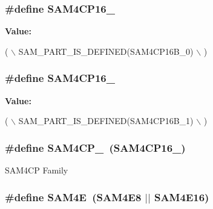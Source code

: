 \hypertarget{group__sam__part__macros__group_gaa7359e4b343a4ab48894b656b2f349b9}{
\subsubsection[{S\-A\-M4\-C\-P16\-\_\-0}]{\setlength{\rightskip}{0pt plus 5cm}\#define S\-A\-M4\-C\-P16\-\_}}\label{group__sam__part__macros__group_gaa7359e4b343a4ab48894b656b2f349b9}
{\bfseries Value\-:}
\begin{DoxyCode}
( \(\backslash\)
                SAM\_PART\_IS\_DEFINED(SAM4CP16B\_0) \(\backslash\)
                )
\end{DoxyCode}
\hypertarget{group__sam__part__macros__group_ga6757116bcbffd58eca2b98b620175590}{
\subsubsection[{S\-A\-M4\-C\-P16\-\_\-1}]{\setlength{\rightskip}{0pt plus 5cm}\#define S\-A\-M4\-C\-P16\-\_}}\label{group__sam__part__macros__group_ga6757116bcbffd58eca2b98b620175590}
{\bfseries Value\-:}
\begin{DoxyCode}
( \(\backslash\)
                SAM\_PART\_IS\_DEFINED(SAM4CP16B\_1) \(\backslash\)
                )
\end{DoxyCode}
\hypertarget{group__sam__part__macros__group_ga01ca8a083b5d4d9ba3c24c9314f69264}{
\subsubsection[{S\-A\-M4\-C\-P\-\_\-0}]{\setlength{\rightskip}{0pt plus 5cm}\#define S\-A\-M4\-C\-P\-\_~(S\-A\-M4\-C\-P16\-\_)}}\label{group__sam__part__macros__group_ga01ca8a083b5d4d9ba3c24c9314f69264}
S\-A\-M4\-C\-P Family \hypertarget{group__sam__part__macros__group_ga7266cd2c26bf5ed34a006ed97f34db76}{
\subsubsection[{S\-A\-M4\-E}]{\setlength{\rightskip}{0pt plus 5cm}\#define S\-A\-M4\-E~(S\-A\-M4\-E8 $|$$|$ S\-A\-M4\-E16)}}\label{group__sam__part__macros__group_ga7266cd2c26bf5ed34a006ed97f34db76}

